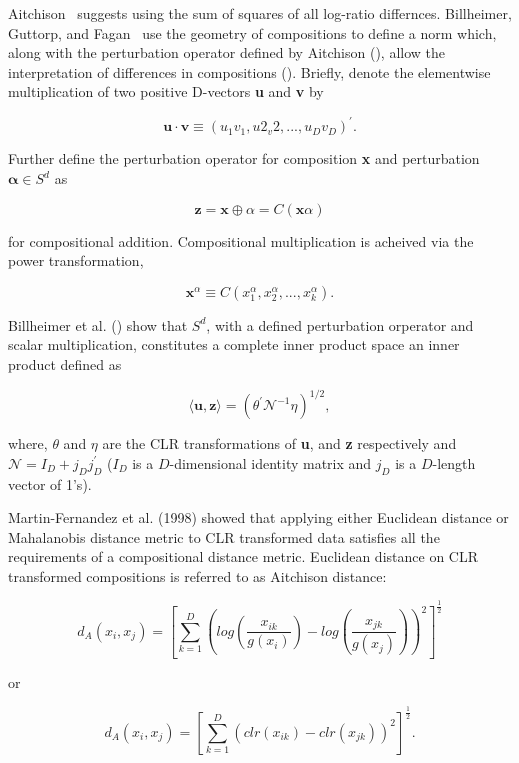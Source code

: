 \documentclass{article}\usepackage[]{graphicx}\usepackage[]{color}
\begin{document}
Aitchison~\cite{Aitchison1986, Aitchison1992} suggests using the sum of squares of all log-ratio differnces.  Billheimer, Guttorp, and Fagan~\cite{Billheimer2001} use the geometry of compositions to define a norm which, along with the perturbation operator defined by Aitchison (\cite{Aitchison1986}), allow the interpretation of differences in compositions (\cite{Billheimer2001}). Briefly, denote the elementwise multiplication of two positive D-vectors \textbf{u} and \textbf{v} by  

$$\mathbf{u}\cdot \mathbf{v} \equiv \left( u_1v_1, u2_v2, ..., u_Dv_D\right)^\prime.$$

Further define the perturbation operator for composition \textbf{x} and perturbation $\mathbf{\alpha} \in S^{d}$ as

$$\mathbf{z} = \mathbf{x}\oplus \alpha = C\left(\mathbf{x}\alpha \right)$$

for compositional addition.  Compositional multiplication is acheived via the power transformation, 

$$\mathbf{x}^\alpha \equiv C\left(x_1^\alpha, x_2^\alpha, ..., x_k^\alpha \right).$$

Billheimer et al. (\cite{Billheimer2001}) show that $S^d$, with a defined perturbation orperator and scalar multiplication, constitutes a complete inner product space an inner product defined as

$$\langle \mathbf{u,z} \rangle = \left( \theta^{\prime}\mathcal{N}^{-1}\eta \right)^{1/2},$$

where, $\theta$ and $\eta$ are the CLR transformations of \textbf{u}, and \textbf{z} respectively and $\mathcal{N} = I_D + j_D^{} j_D^{\prime}$ ($I_D$ is a $D$-dimensional identity matrix and $j_D$ is a $D$-length vector of 1's).



Martin-Fernandez et al. (1998) showed that applying either Euclidean distance or Mahalanobis distance metric to CLR transformed data satisfies all the requirements of a compositional distance metric. Euclidean distance on CLR transformed compositions is referred to as Aitchison distance:

$$d_A(x_i, x_j) = \left[\sum_{k=1}^D \left( log \left(\frac{x_{ik}}{g(x_i)} \right) - log \left(\frac{x_{jk}}{g(x_j)} \right) \right)^2  \right]^\frac{1}{2}$$

or 

$$d_A(x_i, x_j) = \left[\sum_{k=1}^D \left( clr(x_{ik}) - clr(x_{jk}) \right)^2  \right]^\frac{1}{2}.$$
\end{document}
